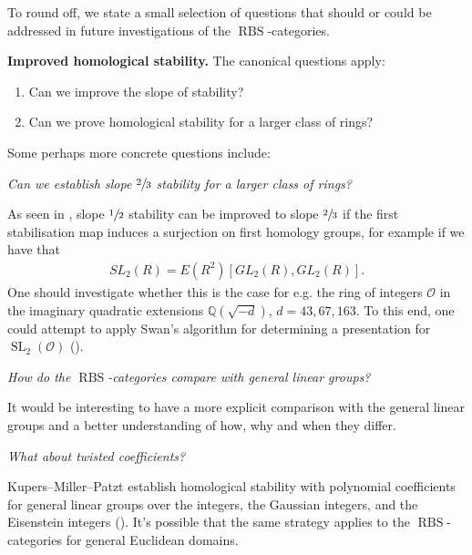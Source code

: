 \documentclass[12pt, reqno]{amsart}
\theoremstyle{plain}
\theoremstyle{definition}
\newcommand{\Q}{\mathbb Q}
\begin{document}
To round off, we state a small selection of questions that should or could be addressed in future investigations of the $\operatorname{RBS}$-categories.

\medskip

\textbf{Improved homological stability.} The canonical questions apply:
\begin{enumerate}
\item Can we improve the slope of stability?
\item Can we prove homological stability for a larger class of rings?
\end{enumerate}

Some perhaps more concrete questions include:

\medskip

\textit{Can we establish slope $\sfrac{2}{3}$ stability for a larger class of rings?}

As seen in , slope $\sfrac{1}{2}$ stability can be improved to slope $\sfrac{2}{3}$ if the first stabilisation map induces a surjection on first homology groups, for example if we have that
\begin{align*}
SL_2(R)= E(R^2)[GL_2(R),GL_2(R)].
\end{align*}
One should investigate whether this is the case for e.g. the ring of integers $\mathcal{O}$ in the imaginary quadratic extensions $\Q(\sqrt{-d})$, $d=43,67,163$. To this end, one could attempt to apply Swan's algorithm for determining a presentation for $\operatorname{SL}_2(\mathcal{O})$ (\cite{Swan71}).

\medskip

\textit{How do the $\operatorname{RBS}$-categories compare with general linear groups?}

It would be interesting to have a more explicit comparison with the general linear groups and a better understanding of how, why and when they differ.

\medskip

\textit{What about twisted coefficients?}

Kupers--Miller--Patzt establish homological stability with polynomial coefficients for general linear groups over the integers, the Gaussian integers, and the Eisenstein integers (\cite[Theorem D]{KupersMillerPatzt}). It's possible that the same strategy applies to the $\operatorname{RBS}$-categories for general Euclidean domains.

\medskip
\end{document}
